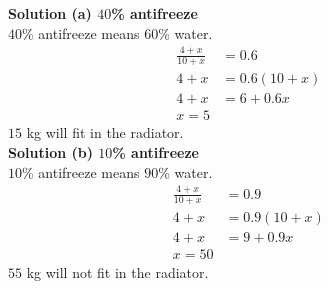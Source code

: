 \documentclass[6pt]{article}
\begin{document}
\textbf{Solution (a) $40$\% antifreeze} \\
$40$\% antifreeze means $60$\% water. \\
\begin{align*}
\frac{4 + x}{10 + x} &= 0.6 && \\
4 + x &= 0.6(10 + x) && \\
4 + x &= 6 + 0.6x && \\
x = 5
\end{align*}
$15$ kg will fit in the radiator. \\
\textbf{Solution (b) $10$\% antifreeze} \\
$10$\% antifreeze means $90$\% water. \\
\begin{align*}
\frac{4 + x}{10 + x} &= 0.9&& \\
4 + x &= 0.9(10 + x) && \\
4 + x &= 9 + 0.9x && \\
x = 50
\end{align*}
$55$ kg will not fit in the radiator. \\
\end{document}
